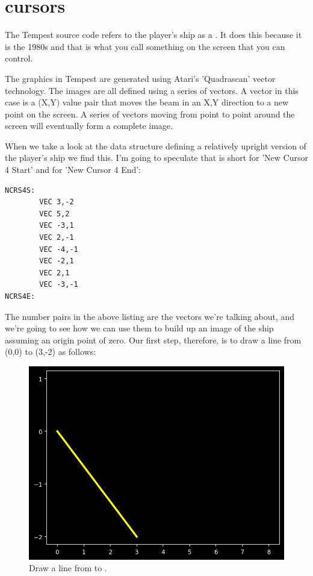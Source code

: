 \chapter{cursors}
\label{sec:cursors}
\lhead[tempest]{}
\lstset{style=6502Style}
The Tempest source code refers to the player's ship as a . It does this because it
is the 1980s and that is what you call something on the screen that you can control.

The graphics in Tempest are generated using Atari's 'Quadrascan' vector
technology. The images are all defined using a series of vectors. A vector in
this case is a (X,Y) value pair that moves the beam in an X,Y direction to a
new point on the screen. A series of vectors moving from point to point around
the screen will eventually form a complete image.

When we take a look at the data structure defining a relatively upright version of the
player's ship we find this. I'm going to speculate that  is short
for 'New Cursor 4 Start' and  for 'New Cursor 4 End':
\begin{lstlisting}
NCRS4S:
        VEC 3,-2
        VEC 5,2
        VEC -3,1
        VEC 2,-1
        VEC -4,-1
        VEC -2,1
        VEC 2,1
        VEC -3,-1
NCRS4E:
\end{lstlisting}

The number pairs in the above listing are the vectors we're talking about, and we're going to see how we can use them to build up
an image of the ship assuming an origin point of zero. Our first step, therefore,
is to draw a line from (0,0) to (3,-2) as follows:

\begin{figure}[H]
    \centering
    \begin{adjustbox}{width=7cm,center}
      \includegraphics[width=12cm]{src/cursors/build_cursor_2_3.png}%
    \end{adjustbox}
  \caption{Draw a line from  to .}
\end{figure}

